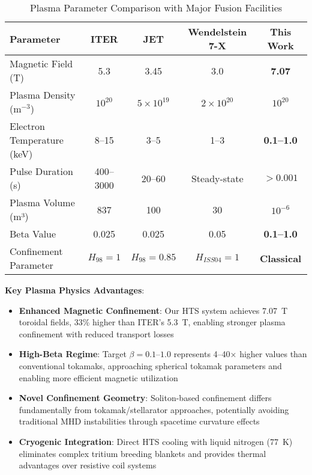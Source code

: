 \documentclass[12pt,a4paper]{article}
\begin{document}
\begin{table}[htbp]
\centering
\caption{Plasma Parameter Comparison with Major Fusion Facilities}
\label{tab:fusion_comparison}
\begin{tabular}{@{}lcccc@{}}
\toprule
Parameter & ITER & JET & Wendelstein 7-X & \textbf{This Work} \\
\midrule
Magnetic Field (T) & 5.3 & 3.45 & 3.0 & \textbf{7.07} \\
Plasma Density (m$^{-3}$) & $10^{20}$ & $5 \times 10^{19}$ & $2 \times 10^{20}$ & \textbf{$10^{20}$} \\
Electron Temperature (keV) & 8--15 & 3--5 & 1--3 & \textbf{0.1--1.0} \\
Pulse Duration (s) & 400--3000 & 20--60 & Steady-state & \textbf{$>0.001$} \\
Plasma Volume (m³) & 837 & 100 & 30 & \textbf{$10^{-6}$} \\
Beta Value & 0.025 & 0.025 & 0.05 & \textbf{0.1--1.0} \\
Confinement Parameter & $H_{98} = 1$ & $H_{98} = 0.85$ & $H_{ISS04} = 1$ & \textbf{Classical} \\
\bottomrule
\end{tabular}
\end{table}

\textbf{Key Plasma Physics Advantages}:
\begin{itemize}
\item \textbf{Enhanced Magnetic Confinement}: Our HTS system achieves 7.07~T toroidal fields, 33\% higher than ITER's 5.3~T, enabling stronger plasma confinement with reduced transport losses
\item \textbf{High-Beta Regime}: Target $\beta = 0.1$--$1.0$ represents 4--40× higher values than conventional tokamaks, approaching spherical tokamak parameters and enabling more efficient magnetic utilization
\item \textbf{Novel Confinement Geometry}: Soliton-based confinement differs fundamentally from tokamak/stellarator approaches, potentially avoiding traditional MHD instabilities through spacetime curvature effects
\item \textbf{Cryogenic Integration}: Direct HTS cooling with liquid nitrogen (77~K) eliminates complex tritium breeding blankets and provides thermal advantages over resistive coil systems
\end{itemize}
\end{document}
